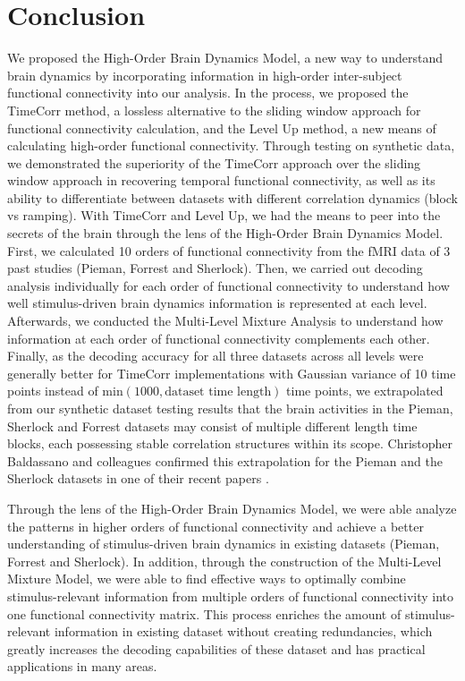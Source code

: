 \documentclass[11pt]{article}
\begin{document}
\section{Conclusion}
We proposed the High-Order Brain Dynamics Model, a new way to understand brain dynamics by incorporating information in high-order inter-subject functional connectivity into our analysis. In the process, we proposed the TimeCorr method, a lossless alternative to the sliding window approach for functional connectivity calculation, and the Level Up method, a new means of calculating high-order functional connectivity. Through testing on synthetic data, we demonstrated the superiority of the TimeCorr approach over the sliding window approach in recovering temporal functional connectivity, as well as its ability to differentiate between datasets with different correlation dynamics (block vs ramping). With TimeCorr and Level Up, we had the means to peer into the secrets of the brain through the lens of the High-Order Brain Dynamics Model. First, we calculated 10 orders of functional connectivity from the fMRI data of 3 past studies (Pieman, Forrest and Sherlock). Then, we carried out decoding analysis individually for each order of functional connectivity to understand how well stimulus-driven brain dynamics information is represented at each level. Afterwards, we conducted the Multi-Level Mixture Analysis to understand how information at each order of functional connectivity complements each other. Finally, as the decoding accuracy for all three datasets across all levels were generally better for TimeCorr implementations with Gaussian variance of 10 time points instead of $\text{min}(1000,\text{dataset time length})$ time points, we extrapolated from our synthetic dataset testing results that the brain activities in the Pieman, Sherlock and Forrest datasets may consist of multiple different length time blocks, each possessing stable correlation structures within its scope. Christopher Baldassano and colleagues confirmed this extrapolation for the Pieman and the Sherlock datasets in one of their recent papers \citep{Baldassano2016}.

Through the lens of the High-Order Brain Dynamics Model, we were able analyze the patterns in higher orders of functional connectivity and achieve a better understanding of stimulus-driven brain dynamics in existing datasets (Pieman, Forrest and Sherlock). In addition, through the construction of the Multi-Level Mixture Model, we were able to find effective ways to optimally combine stimulus-relevant information from multiple orders of functional connectivity into one functional connectivity matrix. This process enriches the amount of stimulus-relevant information in existing dataset without creating redundancies, which greatly increases the decoding capabilities of these dataset and has practical applications in many areas.
\end{document}
